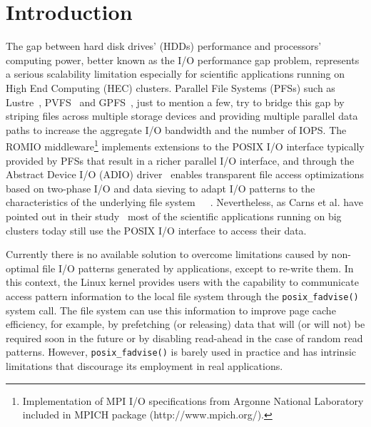 \section{Introduction}
\label{sec: introduction}

The gap between hard disk drives' (HDDs) performance and processors' computing power, better known as the I/O performance gap problem, represents a serious scalability limitation especially for scientific applications running on High End Computing (HEC) clusters. 
Parallel File Systems (PFSs) such as Lustre~\cite{Braam02}, PVFS~\cite{CarnsLRT} and GPFS~\cite{SchmuckH02}, just to mention a few, try to bridge this gap by striping files across multiple storage devices and providing multiple parallel data paths to increase the aggregate I/O bandwidth and the number of IOPS. The ROMIO middleware\footnote{Implementation of MPI I/O specifications from Argonne National Laboratory included in MPICH package (http://www.mpich.org/).} implements extensions to the POSIX I/O interface typically provided by PFSs that result in a richer parallel I/O interface, and through the Abstract Device I/O (ADIO) driver~\cite{ThakurGL96} enables transparent file access optimizations based on two-phase I/O and data sieving to adapt I/O patterns to the characteristics of the underlying file system~\cite{ThakurGL99}~\cite{Ying08}~\cite{ProstTHKW00}.
%
Nevertheless, as Carns et al. have pointed out in their study~\cite{CarnsHABLLR11} most of the scientific applications running on big clusters today still use the POSIX I/O interface to access their data. %

Currently there is no available solution to overcome limitations caused by non-optimal file I/O patterns generated by applications, except to re-write them. In this context, the Linux kernel provides users with the capability to communicate access pattern information to the local file system through the \texttt{posix\_fadvise()}~\cite{AdviseAPI} system call. The file system can use this information to improve page cache efficiency, for example, by prefetching (or releasing) data that will (or will not) be required soon in the future or by disabling read-ahead in the case of random read patterns. However, \texttt{posix\_fadvise()} is barely used in practice and has intrinsic limitations that discourage its employment in real applications. 

